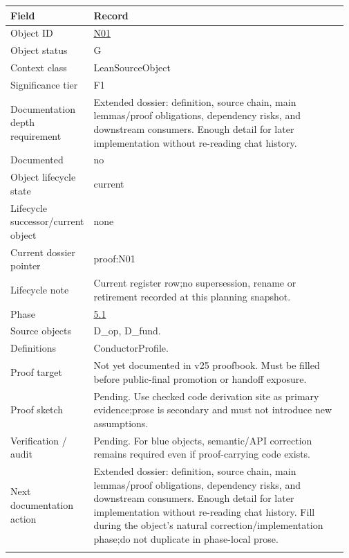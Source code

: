 \begin{longtable}{L{0.16\linewidth} L{0.81\linewidth}}
\hline
\textbf{Field} & \textbf{Record}\\
\hline
Object ID & \hyperlink{object-row-N01}{N01}\\
\hline\addlinespace[0.20em]
Object status & G\\
\hline\addlinespace[0.20em]
Context class & LeanSourceObject\\
\hline\addlinespace[0.20em]
Significance tier & F1\\
\hline\addlinespace[0.20em]
Documentation depth requirement & Extended dossier: definition, source chain, main lemmas/\allowbreak{}proof obligations, dependency risks, and downstream consumers. Enough detail for later implementation without re-reading chat history.\\
\hline\addlinespace[0.20em]
Documented & no\\
\hline\addlinespace[0.20em]
Object lifecycle state & current\\
\hline\addlinespace[0.20em]
Lifecycle successor/\allowbreak{}current object & none\\
\hline\addlinespace[0.20em]
Current dossier pointer & proof:N01\\
\hline\addlinespace[0.20em]
Lifecycle note & Current register row;\newline no supersession, rename or retirement recorded at this planning snapshot.\\
\hline\addlinespace[0.20em]
Phase & \hyperlink{phase-row-5-1}{5.1}\\
\hline\addlinespace[0.20em]
Source objects & D\_op, D\_fund.\\
\hline\addlinespace[0.20em]
Definitions & ConductorProfile.\\
\hline\addlinespace[0.20em]
Proof target & Not yet documented in v25 proofbook. Must be filled before public-final promotion or handoff exposure.\\
\hline\addlinespace[0.20em]
Proof sketch & Pending. Use checked code derivation site as primary evidence;\newline prose is secondary and must not introduce new assumptions.\\
\hline\addlinespace[0.20em]
Verification /\allowbreak{} audit & Pending. For blue objects, semantic/\allowbreak{}API correction remains required even if proof-carrying code exists.\\
\hline\addlinespace[0.20em]
Next documentation action & Extended dossier: definition, source chain, main lemmas/\allowbreak{}proof obligations, dependency risks, and downstream consumers. Enough detail for later implementation without re-reading chat history. Fill during the object's natural correction/\allowbreak{}implementation phase;\newline do not duplicate in phase-local prose.\\
\hline\addlinespace[0.20em]
\end{longtable}
